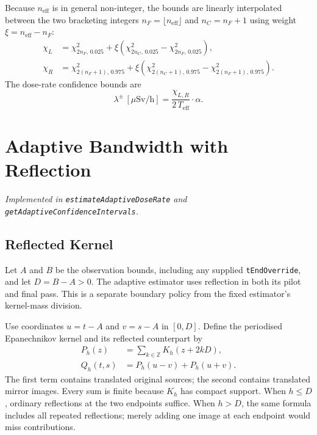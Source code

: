 \documentclass[11pt,a4paper]{article}
\newcommand{\teff}{T_{\mathrm{eff}}} %
\newcommand{\neff}{n_{\mathrm{eff}}} %
\newcommand{\usvh}{\,[\mu\mathrm{Sv/h}]}
\begin{document}
Because $\neff$ is in general non-integer, the bounds are linearly
interpolated between the two bracketing integers
$n_F = \lfloor\neff\rfloor$ and $n_C = n_F + 1$ using weight
$\xi = \neff - n_F$:
\begin{align}
  \chi_L &= \chi^2_{2n_F,\,0.025}
           + \xi\!\left(\chi^2_{2n_C,\,0.025}
                        - \chi^2_{2n_F,\,0.025}\right), \\[4pt]
  \chi_R &= \chi^2_{2(n_F+1),\,0.975}
           + \xi\!\left(\chi^2_{2(n_C+1),\,0.975}
                        - \chi^2_{2(n_F+1),\,0.975}\right).
  \label{eq:chiInterp}
\end{align}
The dose-rate confidence bounds are
\begin{equation}
  \lambda^{\pm}\usvh
  = \frac{\chi_{L,R}}{2\,\teff}\cdot\alpha.
  \label{eq:ciBounds}
\end{equation}

\section{Adaptive Bandwidth with Reflection}
\label{sec:adaptive}

\noindent\textit{Implemented in \texttt{estimateAdaptiveDoseRate} and
\texttt{getAdaptiveConfidenceIntervals}.}

\subsection{Reflected Kernel}

Let $A$ and $B$ be the observation bounds, including any supplied
\texttt{tEndOverride}, and let $D=B-A>0$.  The adaptive estimator uses
reflection in both its pilot and final pass.  This is a separate boundary
policy from the fixed estimator's kernel-mass division.

Use coordinates $u=t-A$ and $v=s-A$ in $[0,D]$.  Define the periodised
Epanechnikov kernel and its reflected counterpart by
\begin{align}
  P_h(z)&=\sum_{k\in\mathbb Z}K_h(z+2kD),\\
  Q_h(t,s)&=P_h(u-v)+P_h(u+v).
  \label{eq:reflectedKernel}
\end{align}
The first term contains translated original sources; the second contains
translated mirror images.  Every sum is finite because $K_h$ has compact
support.  When $h\le D$, ordinary reflections at the two endpoints suffice.
When $h>D$, the same formula includes all repeated reflections; merely
adding one image at each endpoint would miss contributions.
\end{document}
